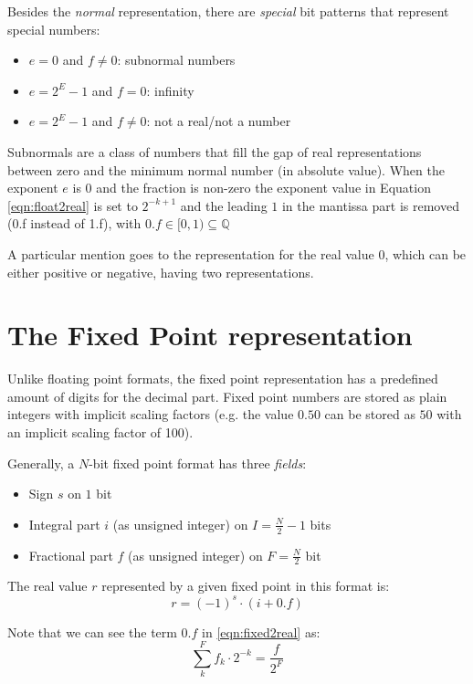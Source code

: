 Besides the \textit{normal} representation, there are \textit{special} bit patterns that represent special numbers:
\begin{itemize}
    \item $e = 0$ and $f \neq 0$: subnormal numbers
    \item $e = 2^{E} - 1$ and $f = 0$: infinity
    \item $e = 2^{E} - 1$ and $f \neq 0$: not a real/not a number
\end{itemize}

Subnormals are a class of numbers that fill the gap of real representations between zero and the minimum normal number (in absolute value). When the exponent $e$ is $0$ and the fraction is non-zero the exponent value in Equation \ref{eqn:float2real} is set to $2^{-k+1}$ and the leading $1$ in the mantissa part is removed (0.f instead of 1.f), with $0.f \in [0,1) \subseteq \mathbb{Q}$

A particular mention goes to the representation for the real value $0$, which can be either positive or negative, having two representations.


\section{The Fixed Point representation}

Unlike floating point formats, the fixed point representation has a predefined amount of digits for the decimal part. Fixed point numbers are stored as plain integers with implicit scaling factors (e.g. the value $0.50$ can be stored as $50$ with an implicit scaling factor of 100).

Generally, a $N$-bit fixed point format has three \textit{fields}:

\begin{itemize}
    \item Sign $s$ on $1$ bit
    \item Integral part $i$ (as unsigned integer) on $I = \frac{N}{2} - 1$ bits
    \item Fractional part $f$ (as unsigned integer) on $F = \frac{N}{2}$ bit
\end{itemize}

The real value $r$ represented by a given fixed point in this format is:
\begin{equation}\label{eqn:fixed2real}
    r = (-1)^s \cdot \left( i + 0.f \right)
\end{equation}

Note that we can see the term $0.f$ in \eqref{eqn:fixed2real} as:
\[
    \sum_k^F f_k \cdot 2^{-k} = \frac{f}{2^F}
\]

